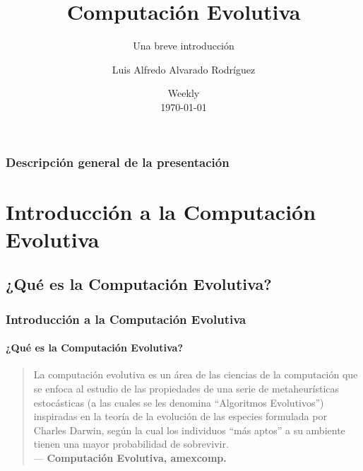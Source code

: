 \documentclass[
	11pt, %
]{beamer}
\title[Computación Evolutiva]{Computación Evolutiva} %
\subtitle{Una breve introducción} %
\author[Luis Alvarado]{Luis Alfredo Alvarado Rodríguez} %
\institute[]{Distelsa \\ \smallskip \textit{luis.alvarado@distelsa.com.gt}} %
\date[\today]{Weekly \\ \today} %
\begin{document}

\begin{frame}
	\titlepage %
\end{frame}


\begin{frame}
	\frametitle{Descripción general de la presentación}
	\tableofcontents
\end{frame}


\section{Introducción a la Computación Evolutiva}


\subsection{¿Qué es la Computación Evolutiva?}

\begin{frame}
        \frametitle{Introducción a la Computación Evolutiva}
	\framesubtitle{¿Qué es la Computación Evolutiva?}
	\begin{quote}
		La computación evolutiva es un área de las ciencias de la computación
            que se enfoca al estudio de las propiedades de una serie de metaheurísticas estocásticas (a las cuales se les denomina “Algoritmos Evolutivos”) inspiradas en la teoría de la evolución de las especies formulada por Charles Darwin, según la cual los individuos “más aptos” a su ambiente tienen una mayor probabilidad de sobrevivir. \\
		--- \textbf{Computación Evolutiva, amexcomp.}
	\end{quote}
	
\end{frame}
\end{document}
